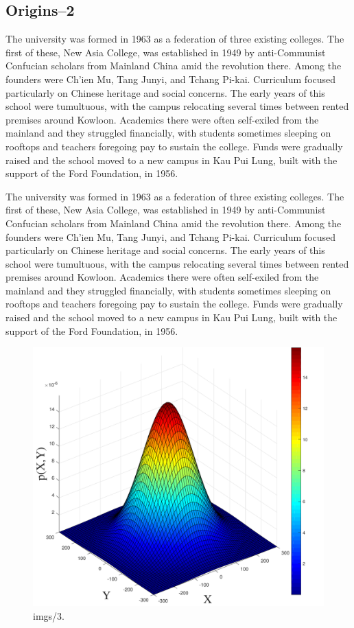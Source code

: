 \subsection{Origins--2}
The university was formed in 1963 as a federation of three existing colleges. The first of these, New Asia College, was established in 1949 by anti-Communist Confucian scholars from Mainland China amid the revolution there. Among the founders were Ch'ien Mu, Tang Junyi, and Tchang Pi-kai. Curriculum focused particularly on Chinese heritage and social concerns. The early years of this school were tumultuous, with the campus relocating several times between rented premises around Kowloon. Academics there were often self-exiled from the mainland and they struggled financially, with students sometimes sleeping on rooftops and teachers foregoing pay to sustain the college. Funds were gradually raised and the school moved to a new campus in Kau Pui Lung, built with the support of the Ford Foundation, in 1956.

The university was formed in 1963 as a federation of three existing colleges. The first of these, New Asia College, was established in 1949 by anti-Communist Confucian scholars from Mainland China amid the revolution there. Among the founders were Ch'ien Mu, Tang Junyi, and Tchang Pi-kai. Curriculum focused particularly on Chinese heritage and social concerns. The early years of this school were tumultuous, with the campus relocating several times between rented premises around Kowloon. Academics there were often self-exiled from the mainland and they struggled financially, with students sometimes sleeping on rooftops and teachers foregoing pay to sustain the college. Funds were gradually raised and the school moved to a new campus in Kau Pui Lung, built with the support of the Ford Foundation, in 1956.

\begin{figure}[t]
\centering
\includegraphics[width=5.5in]{imgs/1}
\caption{imgs/3.}
\label{imgs/3}
\end{figure}

